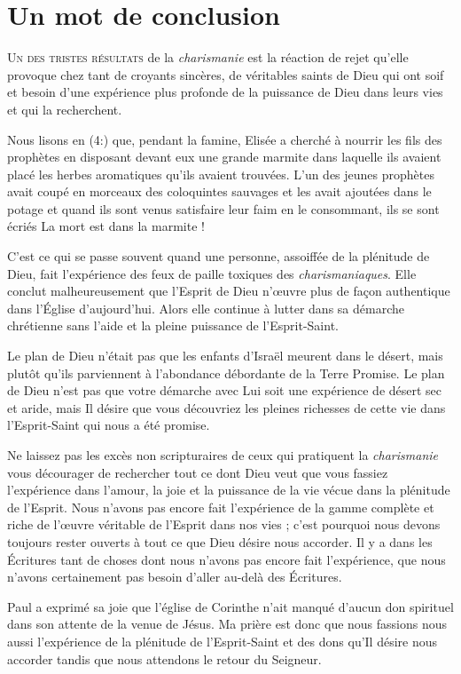 \chapter{Un mot de conclusion}

\lettrine{U}{n des tristes résultats} de la \emph{charismanie}
 est la réaction de rejet
 qu'elle provoque chez tant de croyants sincères, de véritables saints de Dieu
 qui ont soif et besoin d'une expérience 
 plus profonde de la puissance de Dieu
 dans leurs vies et qui la recherchent.

Nous lisons en (4:) que, pendant la famine,
 Elisée a cherché à nourrir les fils des prophètes en disposant devant eux
 une grande marmite dans laquelle ils avaient placé les herbes
 aromatiques qu'ils avaient trouvées.
 L'un des jeunes prophètes avait coupé en morceaux des coloquintes
 sauvages et les avait ajoutées dans le potage et quand ils sont venus
 satisfaire leur faim en le consommant, ils se sont écriés\frcolon{}
 \Og La mort est dans la marmite ! \Fg{}

C'est ce qui se passe souvent quand une personne,
 assoiffée de la plénitude de Dieu, fait l'expérience 
 des feux de paille toxiques
 des \emph{charismaniaques}. Elle conclut malheureusement
 que l'Esprit de Dieu n'œuvre plus de façon authentique
 dans l'Église d'aujourd'hui. Alors elle continue à lutter
 dans sa démarche chrétienne sans l'aide et la pleine puissance
 de l'Esprit-Saint.

Le plan de Dieu n'était pas que les enfants d'Israël meurent
 dans le désert, mais plutôt qu'ils parviennent à l'abondance débordante
 de la Terre Promise. Le plan de Dieu n'est pas que votre démarche
 avec Lui soit une expérience  de désert sec et aride,
 mais Il désire
 que vous découvriez les pleines richesses de cette vie dans l'Esprit-Saint
 qui nous a été promise.

Ne laissez pas les excès non scripturaires de ceux qui pratiquent
 la \emph{charismanie} vous décourager de rechercher tout ce dont Dieu
 veut que vous fassiez l'expérience  dans l'amour,
 la joie et la puissance de la vie vécue dans la plénitude de l'Esprit.
 Nous n'avons pas encore fait l'expérience 
 de la gamme complète
 et riche de l'œuvre véritable de l'Esprit dans nos vies ;
 c'est pourquoi nous devons toujours rester ouverts
 à tout ce que Dieu désire nous accorder.
 Il y a dans les Écritures tant de choses dont nous n'avons pas encore
 fait l'expérience, 
 que nous n'avons certainement pas besoin
 d'aller au-delà des Écritures.

Paul a exprimé sa joie que l'église de Corinthe n'ait manqué
 d'aucun don spirituel dans son attente de la venue de Jésus.
 Ma prière est donc que nous fassions
 nous aussi l'expérience 
 de la plénitude de l'Esprit-Saint et des dons qu'Il désire
 nous accorder tandis que nous attendons le retour du Seigneur.
\closechapter


